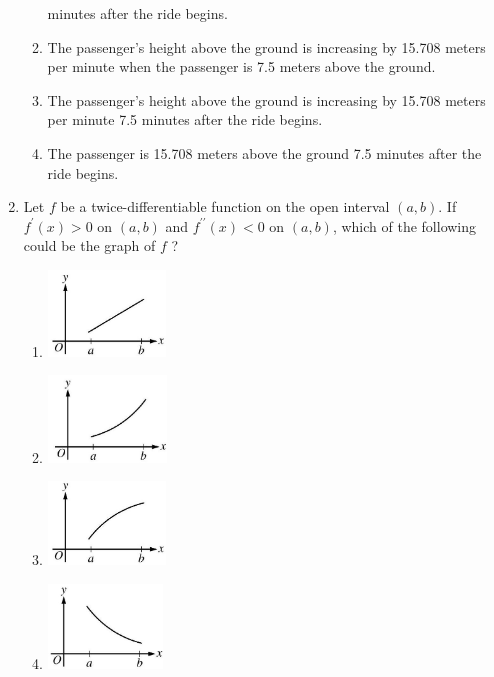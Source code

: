 \documentclass{article}
\begin{document}
\begin{enumerate}
\begin{minipage}[t]{\linewidth}
\begin{enumerate}
minutes after the ride begins.
			\item The passenger's height above the ground is increasing by 15.708 meters
per minute when the passenger is 7.5 meters above the ground.
			\item The passenger's height above the ground is increasing by 15.708 meters
per minute 7.5 minutes after the ride begins.
			\item The passenger is 15.708 meters above the ground 7.5 minutes after the
ride begins.
		\end{enumerate}
	\end{minipage}
	\item
	\begin{minipage}[t]{\linewidth}
		Let \(f\) be a twice-differentiable function on the open interval
\((a, b)\). If \(f^{\prime}(x)>0\) on \((a, b)\) and
\(f^{\prime \prime}(x)<0\) on \((a, b)\), which of the following could
be the graph of \(f\) ?
\vspace{1em}
		\begin{enumerate}
		\itemsep1em
			\item \includegraphics[width=1.23in]{media/e3a9f9b6-3a96-5d2d-add0-e6bd0546df0e.jpg}
			\item \includegraphics[width=1.2466666666666666in]{media/c548d8a9-e1c8-5b9b-ba75-6a9026b15b19.jpg}
			\item \includegraphics[width=1.23in]{media/254534e1-d2aa-57d9-be10-09a482f8eff8.jpg}
			\item \includegraphics[width=1.2in]{media/c968da11-e2ba-553e-ad49-0df2477c4c35.jpg}

\end{enumerate}
\end{minipage}
\end{enumerate}
\end{document}
